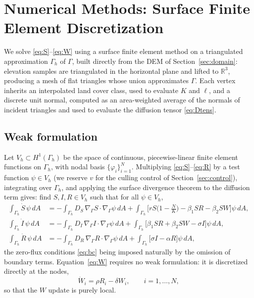 \documentclass[11pt]{article}
\newcommand{\Grad}{\nabla_\Gamma}
\begin{document}
\section{Numerical Methods: Surface Finite Element Discretization}
\label{sec:fem}

We solve \eqref{eq:S}--\eqref{eq:W} using a surface finite element method on a triangulated approximation $\Gamma_h$ of $\Gamma$, built directly from the DEM of Section~\ref{sec:domain}: elevation samples are triangulated in the horizontal plane and lifted to $\mathbb{R}^3$, producing a mesh of flat triangles whose union approximates $\Gamma$. Each vertex inherits an interpolated land cover class, used to evaluate $K$ and $\ell$, and a discrete unit normal, computed as an area-weighted average of the normals of incident triangles and used to evaluate the diffusion tensor \eqref{eq:Dtens}.

\subsection{Weak formulation}
\label{sec:weak}

Let $V_h \subset H^1(\Gamma_h)$ be the space of continuous, piecewise-linear finite element functions on $\Gamma_h$, with nodal basis $\{\varphi_i\}_{i=1}^N$. Multiplying \eqref{eq:S}--\eqref{eq:R} by a test function $\psi \in V_h$ (we reserve $v$ for the culling control of Section~\ref{sec:control}), integrating over $\Gamma_h$, and applying the surface divergence theorem to the diffusion term gives: find $S,I,R \in V_h$ such that for all $\psi \in V_h$,
\begin{align}
\int_{\Gamma_h} \dot S\, \psi\, dA &= -\int_{\Gamma_h} D_S\,\Grad S \cdot \Grad \psi \, dA + \int_{\Gamma_h}\Big[rS\big(1-\tfrac{N}{K}\big) - \beta_1 SR - \beta_2 SW\Big] \psi \, dA, \\
\int_{\Gamma_h} \dot I\, \psi\, dA &= -\int_{\Gamma_h} D_I\,\Grad I \cdot \Grad \psi \, dA + \int_{\Gamma_h}\big[\beta_1 SR + \beta_2 SW - \sigma I\big] \psi \, dA, \\
\int_{\Gamma_h} \dot R\, \psi\, dA &= -\int_{\Gamma_h} D_R\,\Grad R \cdot \Grad \psi \, dA + \int_{\Gamma_h}\big[\sigma I - \alpha R\big] \psi \, dA,
\end{align}
the zero-flux conditions \eqref{eq:bc} being imposed naturally by the omission of boundary terms. Equation~\eqref{eq:W} requires no weak formulation: it is discretized directly at the nodes,
\begin{equation}
\dot W_i = \rho R_i - \delta W_i, \qquad i=1,\dots,N,
\end{equation}
so that the $W$ update is purely local.
\end{document}
